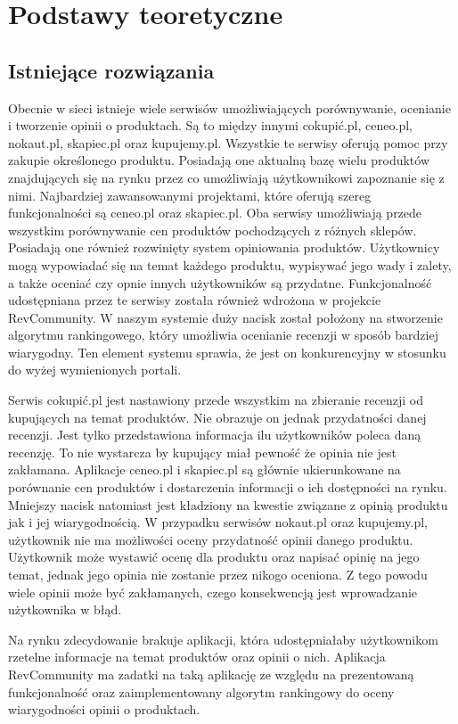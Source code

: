 \chapter{Podstawy teoretyczne}

\section{Istniejące rozwiązania}
Obecnie w sieci istnieje wiele serwisów umożliwiających porównywanie, ocenianie i tworzenie opinii o produktach. Są to między innymi cokupić.pl,  ceneo.pl, nokaut.pl, skapiec.pl oraz kupujemy.pl. Wszystkie te serwisy oferują pomoc przy zakupie określonego produktu. Posiadają one aktualną bazę wielu produktów znajdujących się na rynku przez co umożliwiają użytkownikowi zapoznanie się z nimi. Najbardziej zawansowanymi projektami, które oferują szereg funkcjonalności są ceneo.pl oraz skapiec.pl. Oba serwisy umożliwiają przede wszystkim porównywanie cen produktów pochodzących z różnych sklepów. Posiadają one  również rozwinięty system opiniowania produktów. Użytkownicy mogą wypowiadać się na temat każdego produktu, wypisywać jego wady i zalety, a także oceniać czy opnie innych użytkowników są przydatne. Funkcjonalność udostępniana przez te serwisy została również wdrożona w projekcie RevCommunity. W naszym systemie duży nacisk został położony na stworzenie algorytmu rankingowego, który umożliwia ocenianie recenzji w sposób bardziej wiarygodny. Ten element systemu sprawia, że jest on konkurencyjny w stosunku do wyżej wymienionych portali. 

Serwis cokupić.pl jest nastawiony przede wszystkim na zbieranie recenzji od kupujących na temat produktów. Nie obrazuje on jednak przydatności danej recenzji. Jest tylko przedstawiona informacja ilu użytkowników poleca daną recenzję. To nie wystarcza by kupujący miał pewność że opinia nie jest zakłamana. Aplikacje ceneo.pl i skapiec.pl są głównie ukierunkowane na porównanie cen produktów i dostarczenia informacji o ich dostępności na rynku. Mniejszy nacisk natomiast jest kładziony na kwestie związane z opinią produktu jak i jej wiarygodnością.  W przypadku serwisów nokaut.pl oraz kupujemy.pl, użytkownik nie ma możliwości oceny przydatność opinii danego produktu. Użytkownik może wystawić ocenę dla produktu oraz napisać opinię na jego temat, jednak jego opinia nie zostanie przez nikogo oceniona. Z tego powodu wiele opinii może być zakłamanych, czego konsekwencją jest wprowadzanie użytkownika w błąd. 

Na rynku zdecydowanie brakuje aplikacji, która udostępniałaby użytkownikom rzetelne informacje na temat produktów oraz opinii o nich. Aplikacja RevCommunity ma zadatki na taką aplikację ze względu na prezentowaną funkcjonalność oraz zaimplementowany algorytm rankingowy do oceny wiarygodności opinii o produktach. 



